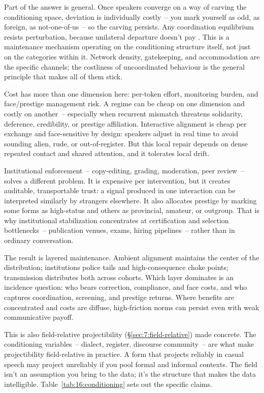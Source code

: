 Part of the answer is general. Once speakers converge on a way of carving the conditioning space, deviation is individually costly~-- you mark yourself as odd, as foreign, as not-one-of-us~-- so the carving persists. Any coordination equilibrium resists perturbation, because unilateral departure doesn't pay \citep{oconnor2019unfairness}. This is a maintenance mechanism operating on the conditioning structure itself, not just on the categories within it. Network density, gatekeeping, and accommodation are the specific channels; the costliness of uncoordinated behaviour is the general principle that makes all of them stick.

Cost has more than one dimension here: per-token effort, monitoring burden, and face/prestige management risk. A regime can be cheap on one dimension and costly on another~-- especially when recurrent mismatch threatens solidarity, deference, credibility, or prestige affiliation. Interactive alignment is cheap per exchange and face-sensitive by design: speakers adjust in real time to avoid sounding alien, rude, or out-of-register. But this local repair depends on dense repeated contact and shared attention, and it tolerates local drift.

Institutional enforcement~-- copy-editing, grading, moderation, peer review~-- solves a different problem. It is expensive per intervention, but it creates auditable, transportable trust: a signal produced in one interaction can be interpreted similarly by strangers elsewhere. It also allocates prestige by marking some forms as high-status and others as provincial, amateur, or outgroup. That is why institutional stabilization concentrates at certification and selection bottlenecks~-- publication venues, exams, hiring pipelines~-- rather than in ordinary conversation.

The result is layered maintenance. Ambient alignment maintains the center of the distribution; institutions police tails and high-consequence choke points; transmission distributes both across cohorts. Which layer dominates is an incidence question: who bears correction, compliance, and face costs, and who captures coordination, screening, and prestige returns. Where benefits are concentrated and costs are diffuse, high-friction norms can persist even with weak communicative payoff.

This is also field-relative projectibility (§\ref{sec:7:field-relative}) made concrete. The conditioning variables~-- dialect, register, discourse community~-- are what make projectibility field-relative in practice. A form that projects reliably in casual speech may project unreliably if you pool formal and informal contexts. The field isn't an assumption you bring to the data; it's the structure that makes the data intelligible. Table~\ref{tab:16:conditioning} sets out the specific claims.

